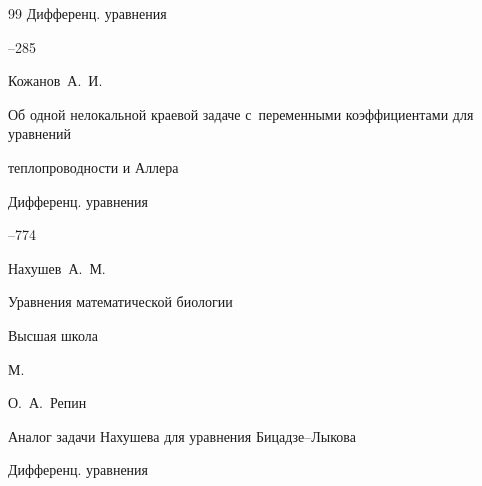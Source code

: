 \begin{thebibliography}{99}
\jour Дифференц. уравнения




--285







\by Кожанов~А.~И.

\paper Об одной нелокальной краевой задаче с~переменными коэффициентами для уравнений

теплопроводности и Аллера

\jour Дифференц. уравнения




--774













\by Нахушев~А.~М.

\book Уравнения математической биологии


\publ Высшая школа

\publaddr М.









\by О.~А.~Репин

\paper Аналог задачи Нахушева для уравнения Бицадзе--Лыкова

\jour Дифференц. уравнения


\end{thebibliography}

